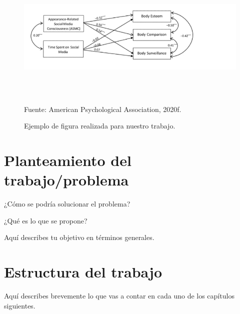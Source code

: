 \begin{figure}[ht]
	\begin{center}
		\caption{Ejemplo de figura realizada para nuestro trabajo.}
		\label{fig:fig-1}
		\includegraphics[width=4.90737in,height=2.42708in]{figura}

		\small Fuente: American Psychological Association, 2020f.
	\end{center}
\end{figure}

\section{Planteamiento del trabajo/problema}

¿Cómo se podría solucionar el problema?

¿Qué es lo que se propone?

Aquí describes tu objetivo en términos generales.

\section{Estructura del trabajo}

Aquí describes brevemente lo que vas a contar en cada uno de los capítulos siguientes.